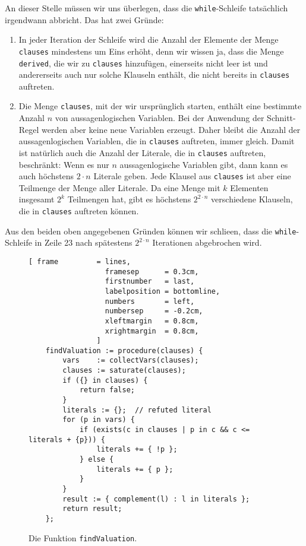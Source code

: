 An dieser Stelle m\"{u}ssen wir uns \"{u}berlegen, dass die \texttt{while}-Schleife tats\"{a}chlich irgendwann
abbricht.  Das hat zwei Gr\"{u}nde:  
\begin{enumerate}
\item In jeder Iteration der Schleife wird die Anzahl der Elemente der Menge \texttt{clauses}
      mindestens um Eins erh\"{o}ht, denn wir wissen ja, dass die Menge \texttt{derived}, die wir zu
      \texttt{clauses} hinzuf\"{u}gen, einerseits nicht leer ist und andererseits auch nur solche
      Klauseln enth\"{a}lt, die nicht bereits in \texttt{clauses} auftreten.
\item Die Menge \texttt{clauses}, mit der wir urspr\"{u}nglich starten, enth\"{a}lt eine bestimmte Anzahl $n$
      von aussagenlogischen Variablen.  Bei der Anwendung der Schnitt-Regel werden aber keine neue
      Variablen erzeugt.  Daher bleibt die Anzahl der aussagenlogischen Variablen, die in
      \texttt{clauses} auftreten, immer gleich.  Damit ist nat\"{u}rlich auch die Anzahl der Literale,
      die in \texttt{clauses} auftreten, beschr\"{a}nkt: Wenn es nur $n$ aussagenlogische Variablen gibt,
      dann kann es auch h\"{o}chstens $2 \cdot n$ Literale geben.  Jede Klausel aus \texttt{clauses} ist
      aber eine Teilmenge der Menge aller Literale.  Da eine Menge mit $k$ Elementen insgesamt $2^k$
      Teilmengen hat, gibt es h\"{o}chstens $2^{2 \cdot n}$ verschiedene Klauseln, die in
      \texttt{clauses} auftreten k\"{o}nnen.  
\end{enumerate}
Aus den beiden oben angegebenen Gr\"{u}nden k\"{o}nnen wir schlie\3en, dass die \texttt{while}-Schleife in
Zeile 23 nach sp\"{a}testens $2^{2 \cdot n}$ Iterationen abgebrochen wird. 

\begin{figure}[!ht]
\centering
\begin{Verbatim}[ frame         = lines, 
                  framesep      = 0.3cm, 
                  firstnumber   = last,
                  labelposition = bottomline,
                  numbers       = left,
                  numbersep     = -0.2cm,
                  xleftmargin   = 0.8cm,
                  xrightmargin  = 0.8cm,
                ]
    findValuation := procedure(clauses) {
        vars    := collectVars(clauses);
        clauses := saturate(clauses);
        if ({} in clauses) {
            return false;
        }
        literals := {};  // refuted literal
        for (p in vars) {
            if (exists(c in clauses | p in c && c <= literals + {p})) {
                literals += { !p };
            } else {
                literals += { p };
            }
        }
        result := { complement(l) : l in literals };
        return result;
    };
\end{Verbatim}
\vspace*{-0.3cm}
\caption{Die Funktion \texttt{findValuation}.}
\label{fig:completeness.stlx-3}
\end{figure}

